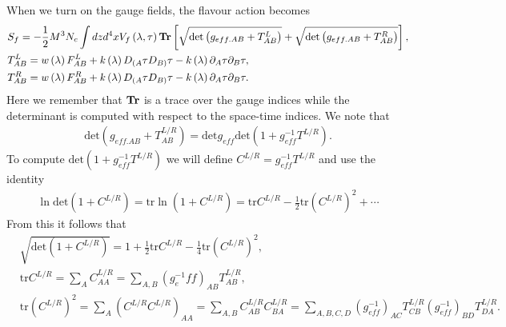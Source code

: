 \documentclass[a4paper,12pt]{article}
\begin{document}
When we turn on the gauge fields, the flavour action becomes
\begin{align}
&S_f = - \frac{1}{2} M^3 N_c \int dz d^4 x V_f \left( \lambda, \tau \right) \bold{Tr} \left[ \sqrt{\text{det} \left(g_{eff. AB} + T^{L}_{AB}\right)} + \sqrt{\text{det} \left(g_{eff. AB} + T^{R}_{AB}\right)} \right], \\
&T^{L}_{AB} = w\left(\lambda\right) F^{L}_{AB} + k\left(\lambda\right)D_{(A}\tau D_{B)}\tau -   k\left(\lambda\right) \partial_A \tau \partial_B \tau , \\
&T^{R}_{AB} = w\left(\lambda\right) F^{R}_{AB} + k\left(\lambda\right)D_{(A}\tau D_{B)}\tau - k\left(\lambda\right) \partial_A \tau \partial_B \tau .
\end{align}
Here we remember that $\bold{Tr}$ is a trace over the gauge indices while the determinant is computed with respect to the space-time indices. We note that
\begin{align}
\text{det}\left(g_{eff. AB} + T^{L/R}_{AB} \right) = \text{det}{g_{eff}}  \text{det} \left( 1 + g_{eff}^{-1} T^{L/R} \right).
\end{align}
To compute $\text{det} \left( 1 + g_{eff}^{-1} T^{L/R} \right)$ we will define $C^{L/R} = g_{eff}^{-1} T^{L/R}$ and use the identity
\begin{align}
\ln \text{det} \left(1+C^{L/R}\right) = \text{tr} \ln\left(1 + C^{L/R}\right) = \text{tr} C^{L/R} - \frac{1}{2} \text{tr} {\left(C^{L/R}\right)}^2 + \cdots
\end{align}
From this it follows that
\begin{align}
&\sqrt{\text{det}  \left(1+C^{L/R}\right)} = 1 + \frac{1}{2} \text{tr} C^{L/R} - \frac{1}{4} \text{tr} {\left(C^{L/R}\right)}^2, \\
& \text{tr} C^{L/R} = \sum_A C^{L/R}_{AA} = \sum _{A,B}  \left(g^{-1}_eff\right)_{AB} T^{L/R}_{AB}, \\
& \text{tr} {\left(C^{L/R}\right)}^2 =  \sum_A \left(C^{L/R} C^{L/R} \right)_{AA} = \sum_{A,B} C^{L/R}_{AB} C^{L/R}_{BA} = \sum_{A,B,C,D}  \left(g^{-1}_{eff}\right)_{AC} T^{L/R}_{CB} \left(g^{-1}_{eff}\right)_{BD} T^{L/R}_{DA}.
\end{align}
\end{document}
